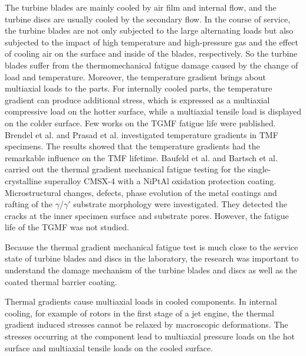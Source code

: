 \documentclass[preprint,5p,twocolumn,11pt,sort&compress]{elsarticle}
\begin{document}
The turbine blades are mainly cooled by air film and internal flow, and the turbine discs are usually cooled by the secondary flow.
In the course of service, the turbine blades are not only subjected to the large alternating loads but also subjected to the impact of high temperature and high-pressure gas and the effect of cooling air on the surface and inside of the blades, respectively. So the turbine blades suffer from the thermomechanical fatigue damage caused by the change of load and temperature.
Moreover, the temperature gradient brings about multiaxial loads to the parts.
For internally cooled parts, the temperature gradient can produce additional stress, which is expressed as a multiaxial compressive load on the hotter surface, while a multiaxial tensile load is displayed on the colder surface.
Few works on the TGMF fatigue life were published.
Brendel et al. \cite{BRENDEL2008234} and Prasad et al. \cite{PRASAD2013131} investigated temperature gradients in TMF specimens. The results showed that the temperature gradients had the remarkable influence on the TMF lifetime.
Baufeld et al. \cite{BAUFELD2008219} and Bartsch et al. \cite{BARTSCH2008211} carried out the thermal gradient mechanical fatigue testing for the single-crystalline superalloy CMSX-4 with a NiPtAl oxidation protection coating.
Microstructural changes, defects, phase evolution of the metal coatings and rafting of the $\gamma$/$\gamma'$ substrate morphology were investigated. They detected the cracks at the inner specimen surface and substrate pores. However, the fatigue life of the TGMF was not studied.

Because the thermal gradient mechanical fatigue test is much close to the service state of turbine blades and discs in the laboratory, the research was important to understand the damage mechanism of the turbine blades and discs as well as the coated thermal barrier coating.

Thermal gradients cause multiaxial loads in cooled components.
In internal cooling, for example of rotors in the first stage of a jet engine, the thermal gradient induced stresses cannot be relaxed by macroscopic deformations.
The stresses occurring at the component lead to multiaxial pressure loads on the hot surface and multiaxial tensile loads on the cooled surface.
\end{document}
